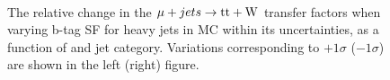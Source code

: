 \begin{figure}[!h]
  \centering
   ~~
  \\

  \caption{\label{fig:tfSyst_bsf_muToTtw} The relative change in the $\mu + jets \rightarrow \mathrm{tt+W}$ transfer
  factors when varying b-tag SF for heavy jets in MC within its uncertainties, as a function of \scalht and jet category. 
  Variations corresponding to $+1\sigma$ ($-1\sigma$) are shown in the left (right) figure. 
  }
\end{figure}

\clearpage %

